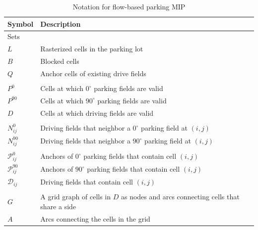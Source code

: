 \documentclass[10pt]{article}
\newcommand{\lotset}{L}
\newcommand{\validzeroparkset}{P^{0}}
\newcommand{\validninetyparkset}{P^{90}}
\newcommand{\validdriveset}{D}
\newcommand{\existingdriveset}{Q}
\newcommand{\blockedset}{B}
\newcommand{\grid}{G}
\newcommand{\gridarcset}{A}
\newcommand{\zeroneighborset}[2]{N_{#1#2}^{0}}
\newcommand{\ninetyneighborset}[2]{N_{#1#2}^{90}}
\newcommand{\invzeroparkset}[2]{\mathcal{P}_{#1#2}^{0}}
\newcommand{\invninetyparkset}[2]{\mathcal{P}_{#1#2}^{90}}
\newcommand{\invdriveset}[2]{\mathcal{D}_{#1#2}}
\theoremstyle{definition}
\begin{document}
\begin{longtable}{ll}
    \caption{Notation for flow-based parking MIP}\label{tab:glosssary}\\
    \hline
    \textbf{Symbol} & \textbf{Description}\\
    \hline
    \endfirsthead
    \hline
    Sets & \\
    \hline
    $\lotset$ & Rasterized cells in the parking lot\\
    $\blockedset$ & Blocked cells\\
    $\existingdriveset$ & Anchor cells of existing drive fields\\
    \vspace{-1.2mm} & \vspace{-1.2mm} \\
    $\validzeroparkset$ & Cells at which $0^\circ$ parking fields are valid\\
    $\validninetyparkset$ & Cells at which $90^{\circ}$ parking fields are valid\\
    $\validdriveset$ & Cells at which driving fields are valid\\
    \vspace{-1.2mm} & \vspace{-1.2mm} \\
    $\zeroneighborset{i}{j}$ & Driving fields that neighbor a $0^\circ$ parking field at $(i,j)$\\
    $\ninetyneighborset{i}{j}$ & Driving fields that neighbor a $90^{\circ}$ parking field at $(i,j)$\\
    \vspace{-1.2mm} & \vspace{-1.2mm} \\
    $\invzeroparkset{i}{j}$ & Anchors of  $0^\circ$ parking fields that contain cell  $(i,j)$\\
    $\invninetyparkset{i}{j}$ & Anchors of $90^{\circ}$ parking fields that contain cell $(i,j)$\\
    $\invdriveset{i}{j}$ & Driving fields that contain cell $(i,j)$\\
    \vspace{-1.2mm} & \vspace{-1.2mm} \\
    $\grid$ & A grid graph of cells in $\validdriveset$ as nodes and arcs connecting cells that share a side \\
    $\gridarcset$ & Arcs connecting the cells in the grid \\

\end{longtable}
\end{document}
